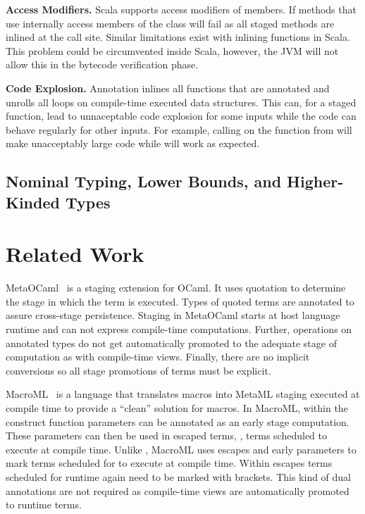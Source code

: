 {\bf Access Modifiers.} Scala supports access modifiers of members. If methods that use \ct internally access  members of the class \ct will fail as all staged methods are inlined at the call site. Similar limitations exist with inlining functions in Scala. This problem could be circumvented inside Scala, however, the JVM will not allow this in the bytecode verification phase.

{\bf Code Explosion.} Annotation  inlines all functions that are annotated and unrolls all loops on compile-time executed data structures. This can, for a staged function, lead to unnaceptable code explosion for some inputs while the code can behave regularly for other inputs. For example, calling  on the function from  will make unacceptably large code while  will work as expected.

\subsection{Nominal Typing, Lower Bounds, and Higher-Kinded Types}
\label{sct:nominal-typing}


\section{Related Work}
\label{sct:related-work}

MetaOCaml~\cite{taha_multi-stage_1997,calcagno2003implementing} is a staging extension
 for OCaml. It uses quotation to determine the stage in which the term is executed. Types of quoted terms are annotated
 to assure cross-stage persistence. Staging in MetaOCaml starts at host language runtime and
 can not express compile-time computations. Further, operations on annotated types
 do not get automatically promoted to the adequate stage of computation as with compile-time views.
 Finally, there are no implicit conversions so all stage promotions of terms must be explicit.

MacroML~\cite{ganz2001macros} is a language that translates macros into MetaML staging executed
 at compile time to provide a ``clean'' solution for macros. In MacroML, within
 the  construct function parameters can be annotated as an early stage computation. These parameters
 can then be used in escaped terms, \ie, terms scheduled to execute at compile time. Unlike \ct, MacroML
 uses escapes and early parameters to mark terms scheduled for to execute at compile time. Within
 escapes terms scheduled for runtime again need to be marked with brackets. This kind of dual annotations are
 not required as compile-time views are automatically promoted to runtime terms.

